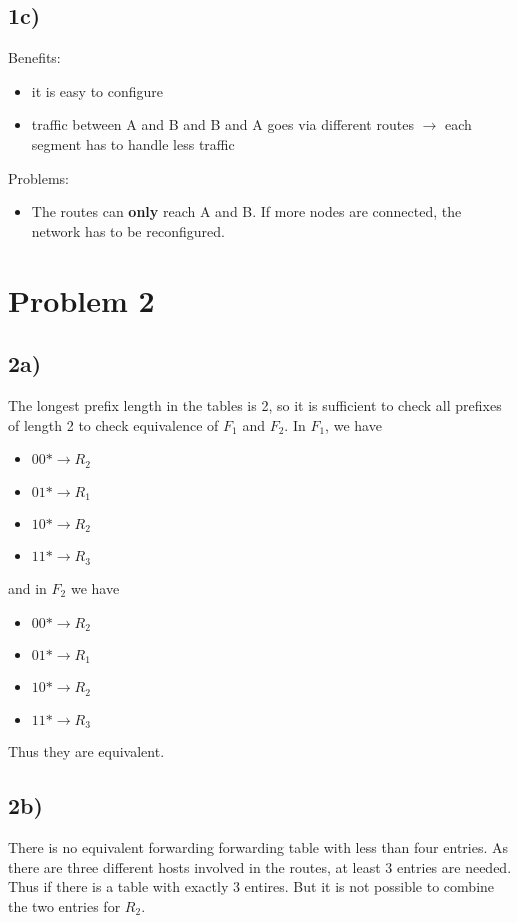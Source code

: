\documentclass[a4paper,10pt]{article}
\begin{document}
\subsection{1c)}
Benefits:
\begin{itemize}
  \item it is easy to configure
  \item traffic between A and B and B and A goes via different routes $\rightarrow$ each segment has to handle less traffic
\end{itemize}
Problems:
\begin{itemize}
  \item The routes can \textbf{only} reach A and B. If more nodes are connected, the network has to be reconfigured.
\end{itemize}

\section{Problem 2}

\subsection{2a)}
The longest prefix length in the tables is 2, so it is sufficient to check all prefixes of length 2 to check equivalence of $F_1$ and $F_2$. In $F_1$, we have
\begin{itemize}
  \item $00* \rightarrow R_2$
  \item $01* \rightarrow R_1$
  \item $10* \rightarrow R_2$
  \item $11* \rightarrow R_3$
\end{itemize}
and in $F_2$ we have
\begin{itemize}
  \item $00* \rightarrow R_2$
  \item $01* \rightarrow R_1$
  \item $10* \rightarrow R_2$
  \item $11* \rightarrow R_3$
\end{itemize}
Thus they are equivalent.

\subsection{2b)}
There is no equivalent forwarding forwarding table with less than four entries. As there are three different hosts involved in the routes, at least 3 entries are needed. Thus if there is a table with exactly 3 entires. But it is not possible to combine the two entries for $R_2$.
\end{document}
